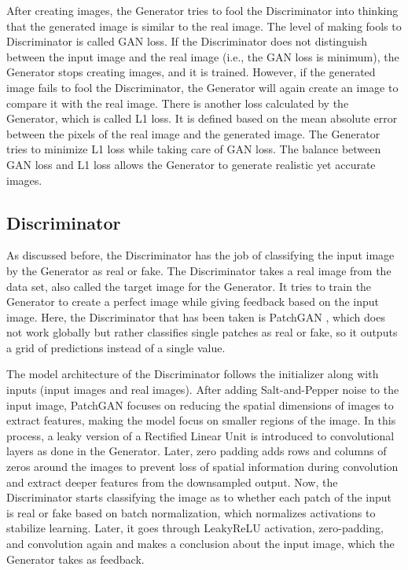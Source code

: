 After creating images, the Generator tries to fool the Discriminator into thinking that the generated image is similar to the real image. The level of making fools to Discriminator is called GAN loss. If the Discriminator does not distinguish between the input image and the real image (i.e., the GAN loss is minimum), the Generator stops creating images, and it is trained. However, if the generated image fails to fool the Discriminator, the Generator will again create an image to compare it with the real image. There is another loss calculated by the Generator, which is called L1 loss. It is defined based on the mean absolute error between the pixels of the real image and the generated image. The Generator tries to minimize L1 loss while taking care of GAN loss. The balance between GAN loss and L1 loss allows the Generator to generate realistic yet accurate images. 

\subsection{Discriminator}
As discussed before, the Discriminator has the job of classifying the input image by the Generator as real or fake. The Discriminator takes a real image from the data set, also called the target image for the Generator. It tries to train the Generator to create a perfect image while giving feedback based on the input image. Here, the Discriminator that has been taken is PatchGAN \cite{isola2017image}, which does not work globally but rather classifies single patches as real or fake, so it outputs a grid of predictions instead of a single value. 

The model architecture of the Discriminator follows the initializer along with inputs (input images and real images). After adding Salt-and-Pepper noise to the input image, PatchGAN focuses on reducing the spatial dimensions of images to extract features, making the model focus on smaller regions of the image. In this process, a leaky version of a Rectified Linear Unit is introduced to convolutional layers as done in the Generator. Later, zero padding adds rows and columns of zeros around the images to prevent loss of spatial information during convolution and extract deeper features from the downsampled output. Now, the Discriminator starts classifying the image as to whether each patch of the input is real or fake based on batch normalization, which normalizes activations to stabilize learning. Later, it goes through LeakyReLU activation, zero-padding, and convolution again and makes a conclusion about the input image, which the Generator takes as feedback.

